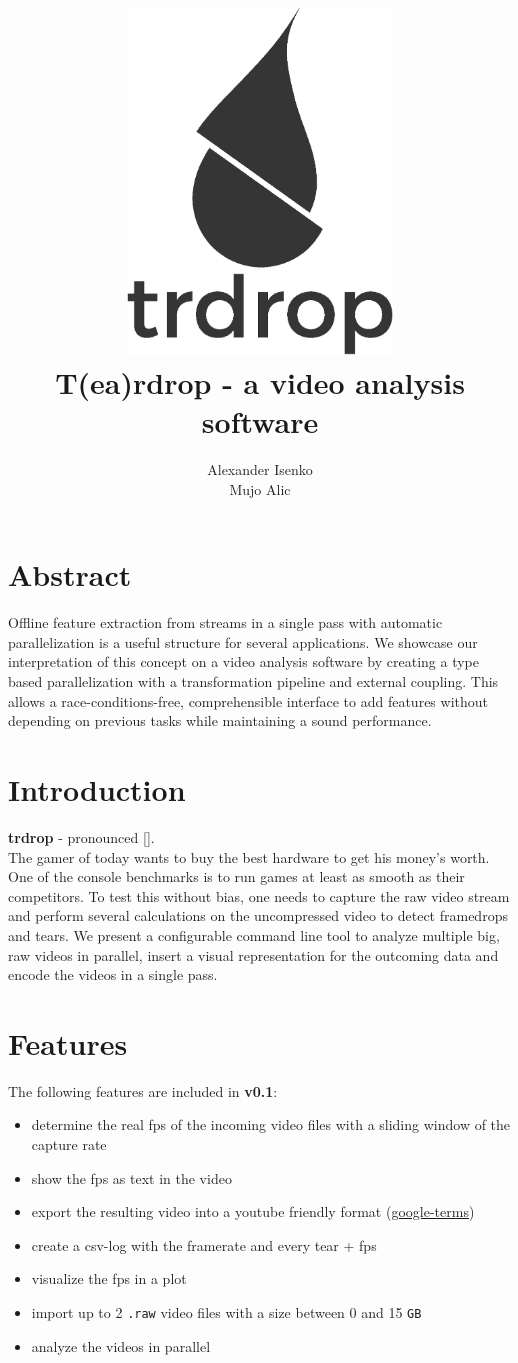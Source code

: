 \documentclass[titlepage]{article}
\title{\includegraphics[width=200pt, height=260pt]{../../images/trdrop_logo_text.eps} \\[50pt]
T(ea)rdrop - a video analysis software}
\author{Alexander Isenko\\Mujo Alic}
\date{}
\begin{document}
\maketitle

\newpage

\section{Abstract}
Offline feature extraction from streams in a single pass with automatic parallelization is a useful structure for several applications. We showcase our interpretation of this concept on a video analysis software by creating a type based parallelization with a transformation pipeline and external coupling. This allows a race-conditions-free, comprehensible interface to add features without depending on previous tasks while maintaining a sound performance.

\section{Introduction}

\textbf{trdrop} - pronounced [\textit{}]. \\[2mm]
\hfill
The gamer of today wants to buy the best hardware to get his money's worth. One of the console benchmarks is to run games at least as smooth as their competitors. To test this without bias, one needs to capture the raw video stream and perform several calculations on the uncompressed video to detect framedrops and tears. We present a configurable command line tool to analyze multiple big, raw videos in parallel, insert a visual representation for the outcoming data and encode the videos in a single pass. 

\section{Features}

The following features are included in \textbf{v0.1}:

\begin{itemize}
    \item determine the real fps of the incoming video files with a sliding window of the capture rate
    \item show the fps as text in the video
    \item export the resulting video into a youtube friendly format (\href{https://support.google.com/youtube/answer/1722171}{google-terms})
    \item create a csv-log with the framerate and every tear + fps
    \item visualize the fps in a plot
    \item import up to 2 \texttt{.raw} video files with a size between 0 and 15 \texttt{GB}
        \item analyze the videos in parallel
    
\end{itemize}
\end{document}
